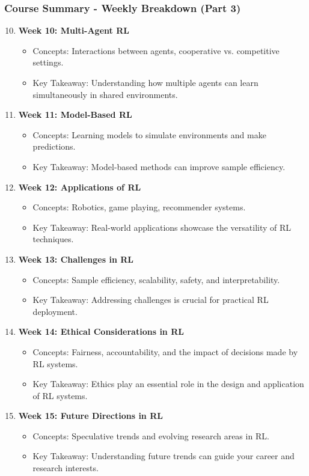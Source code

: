 \documentclass[aspectratio=169]{beamer}
\begin{document}
\begin{frame}[fragile]
    \frametitle{Course Summary - Weekly Breakdown (Part 3)}
    \begin{enumerate}
        \setcounter{enumi}{9}
        \item \textbf{Week 10: Multi-Agent RL}
            \begin{itemize}
                \item Concepts: Interactions between agents, cooperative vs. competitive settings.
                \item Key Takeaway: Understanding how multiple agents can learn simultaneously in shared environments.
            \end{itemize}
        \item \textbf{Week 11: Model-Based RL}
            \begin{itemize}
                \item Concepts: Learning models to simulate environments and make predictions.
                \item Key Takeaway: Model-based methods can improve sample efficiency.
            \end{itemize}
        \item \textbf{Week 12: Applications of RL}
            \begin{itemize}
                \item Concepts: Robotics, game playing, recommender systems.
                \item Key Takeaway: Real-world applications showcase the versatility of RL techniques.
            \end{itemize}
        \item \textbf{Week 13: Challenges in RL}
            \begin{itemize}
                \item Concepts: Sample efficiency, scalability, safety, and interpretability.
                \item Key Takeaway: Addressing challenges is crucial for practical RL deployment.
            \end{itemize}
        \item \textbf{Week 14: Ethical Considerations in RL}
            \begin{itemize}
                \item Concepts: Fairness, accountability, and the impact of decisions made by RL systems.
                \item Key Takeaway: Ethics play an essential role in the design and application of RL systems.
            \end{itemize}
        \item \textbf{Week 15: Future Directions in RL}
            \begin{itemize}
                \item Concepts: Speculative trends and evolving research areas in RL.
                \item Key Takeaway: Understanding future trends can guide your career and research interests.
            \end{itemize}
    \end{enumerate}
\end{frame}
\end{document}
